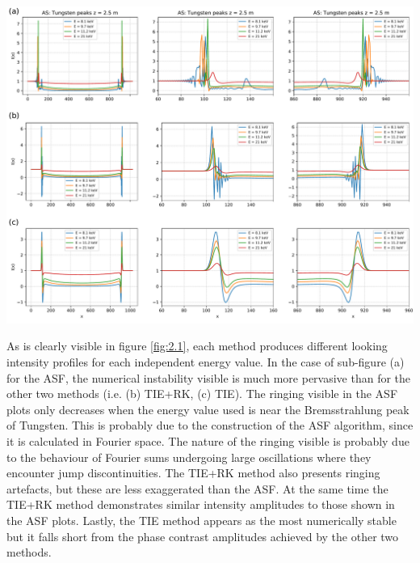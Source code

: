 \documentclass[10pt, a4paper, singlespacing]{report}
\newenvironment{Figure}
    {\par\medskip\noindent\minipage{\linewidth}}
    {\endminipage\par\medskip}
\begin{document}
\begin{Figure} 
 \centering
  \hspace*{-0.9cm}
 \includegraphics[width=\linewidth]{AS_vs_TIE+RK_vs_TIE_1.pdf}
\label{fig:2.1} 
\end{Figure}

As is clearly visible in figure \ref{fig:2.1}, each method produces different looking intensity profiles for each independent energy value. In the case of sub-figure (a) for the ASF, the numerical instability visible is much more pervasive than for the other two methods (i.e. (b) TIE+RK, (c) TIE). The ringing visible in the ASF plots only decreases when the energy value used is near the Bremsstrahlung peak of Tungsten. This is probably due to the construction of the ASF algorithm, since it is calculated in Fourier space. The nature of the ringing visible is probably due to the behaviour of Fourier sums undergoing large oscillations where they encounter jump discontinuities. The TIE+RK method also presents  ringing artefacts, but these are less exaggerated than the ASF. At the same time the TIE+RK method demonstrates similar intensity amplitudes to those shown in the ASF plots.
Lastly, the TIE method appears as the most numerically stable but it falls short from the phase contrast amplitudes achieved by the other two methods.
\end{document}
